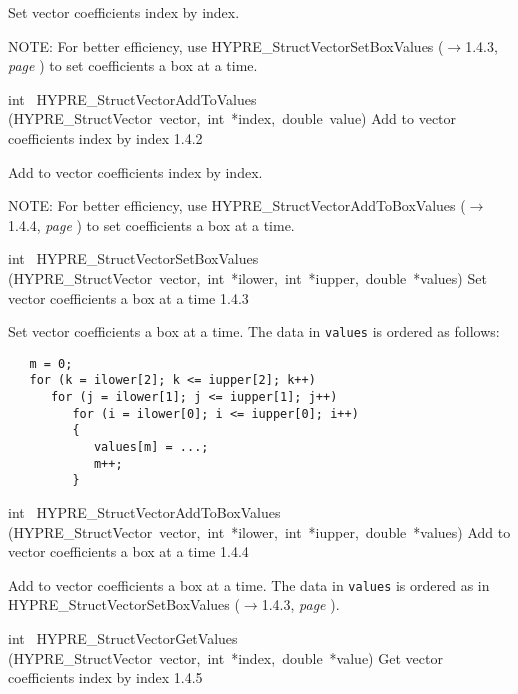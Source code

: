 \documentclass{article}
\begin{document}
\begin{cxxentry}
\begin{cxxentry}
\begin{cxxfunction}
\begin{cxxdoc}
Set vector coefficients index by index.

NOTE: For better efficiency, use HYPRE\_StructVectorSetBoxValues ($\rightarrow$1.4.3, {\em page \pageref{cxx.1.4.3}}) to set
coefficients a box at a time.
\end{cxxdoc}
\end{cxxfunction}
\begin{cxxfunction}
{int\ }
        {HYPRE\_StructVectorAddToValues}
        {(HYPRE\_StructVector\ vector,\ int\ *index,\ double\ value)}
        {
Add to vector coefficients index by index}
        {1.4.2}
\begin{cxxdoc}

Add to vector coefficients index by index.

NOTE: For better efficiency, use HYPRE\_StructVectorAddToBoxValues ($\rightarrow$1.4.4, {\em page \pageref{cxx.1.4.4}}) to
set coefficients a box at a time.
\end{cxxdoc}
\end{cxxfunction}
\begin{cxxfunction}
{int\ }
        {HYPRE\_StructVectorSetBoxValues}
        {(HYPRE\_StructVector\ vector,\ int\ *ilower,\ int\ *iupper,\ double\ *values)}
        {
Set vector coefficients a box at a time}
        {1.4.3}
\begin{cxxdoc}

Set vector coefficients a box at a time.  The data in {\tt values} is ordered
as follows:

\begin{verbatim}
   m = 0;
   for (k = ilower[2]; k <= iupper[2]; k++)
      for (j = ilower[1]; j <= iupper[1]; j++)
         for (i = ilower[0]; i <= iupper[0]; i++)
         {
            values[m] = ...;
            m++;
         }
   \end{verbatim}
\end{cxxdoc}
\end{cxxfunction}
\begin{cxxfunction}
{int\ }
        {HYPRE\_StructVectorAddToBoxValues}
        {(HYPRE\_StructVector\ vector,\ int\ *ilower,\ int\ *iupper,\ double\ *values)}
        {
Add to vector coefficients a box at a time}
        {1.4.4}
\begin{cxxdoc}

Add to vector coefficients a box at a time.  The data in {\tt values} is
ordered as in HYPRE\_StructVectorSetBoxValues ($\rightarrow$1.4.3, {\em page \pageref{cxx.1.4.3}}).
\end{cxxdoc}
\end{cxxfunction}
\begin{cxxfunction}
{int\ }
        {HYPRE\_StructVectorGetValues}
        {(HYPRE\_StructVector\ vector,\ int\ *index,\ double\ *value)}
        {
Get vector coefficients index by index}
        {1.4.5}
\begin{cxxdoc}


\end{cxxdoc}
\end{cxxfunction}
\end{cxxentry}
\end{cxxentry}
\end{document}
